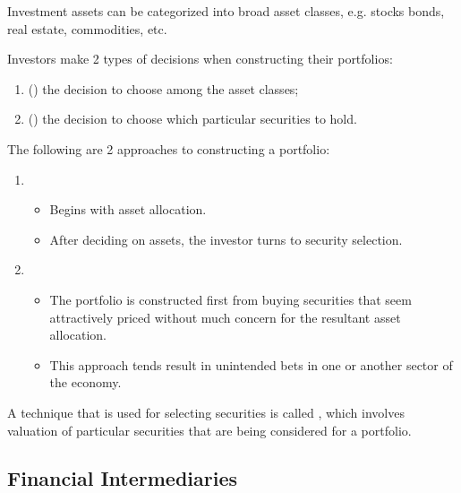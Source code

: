 \documentclass[notoc,notitlepage]{tufte-book}
\begin{document}
Investment assets can be categorized into broad asset classes,
e.g. stocks bonds, real estate, commodities, etc.

Investors make 2 types of decisions when constructing their portfolios:
\begin{enumerate}
  \item () the decision to choose among the asset
    classes;
  \item () the decision to choose
    which particular securities to hold.
\end{enumerate}

The following are 2 approaches to constructing a portfolio:
\begin{enumerate}
  \item {}
    \begin{itemize}
      \item Begins with asset allocation.
      \item After deciding on assets, the investor turns to
        security selection.
    \end{itemize}
  \item {}
    \begin{itemize}
      \item The portfolio is constructed first from buying
        securities that seem attractively priced without
        much concern for the resultant asset allocation.
      \item This approach tends result in unintended bets
        in one or another sector of the economy.
    \end{itemize}
\end{enumerate}

A technique that is used for selecting securities is called
, which involves valuation of particular securities
that are being considered for a portfolio.


\subsection{Financial Intermediaries}%
\label{sub:financial_intermediaries}
\end{document}
